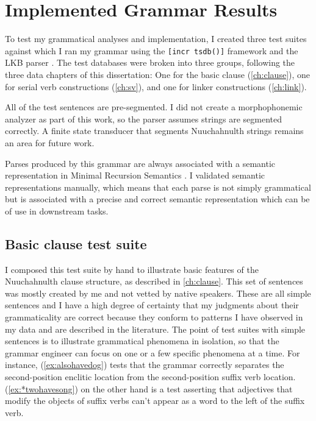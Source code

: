 \chapter{Implemented Grammar Results} \label{ch:results}

To test my grammatical analyses and implementation, I created three test suites against which I ran my grammar using the \texttt{[incr tsdb()]} framework \citep{oepen2001} and the LKB parser \citep{copestake2002}. The test databases were broken into three groups, following the three data chapters of this dissertation: One for the basic clause (\cref{ch:clause}), one for serial verb constructions (\cref{ch:sv}), and one for linker constructions (\cref{ch:link}).

All of the test sentences are pre-segmented. I did not create a morphophonemic analyzer as part of this work, so the parser assumes strings are segmented correctly. A finite state transducer that segments Nuuchahnulth strings remains an area for future work.

Parses produced by this grammar are always associated with a semantic representation in Minimal Recursion Semantics \citep{copestake2005}. I validated semantic representations manually, which means that each parse is not simply grammatical but is associated with a precise and correct semantic representation which can be of use in downstream tasks.

\section{Basic clause test suite} \label{ch:results:clause}

I composed this test suite by hand to illustrate basic features of the Nuuchahnulth clause structure, as described in \cref{ch:clause}. This set of sentences was mostly created by me and not vetted by native speakers. These are all simple sentences and I have a high degree of certainty that my judgments about their grammaticality are correct because they conform to patterns I have observed in my data and are described in the literature. The point of test suites with simple sentences is to illustrate grammatical phenomena in isolation, so that the grammar engineer can focus on one or a few specific phenomena at a time. For instance, (\ref{ex:alsohavedog}) tests that the grammar correctly separates the second-position enclitic location from the second-position suffix verb location. (\ref{ex:*twohavesong}) on the other hand is a test asserting that adjectives that modify the objects of suffix verbs can't appear as a word to the left of the suffix verb.

